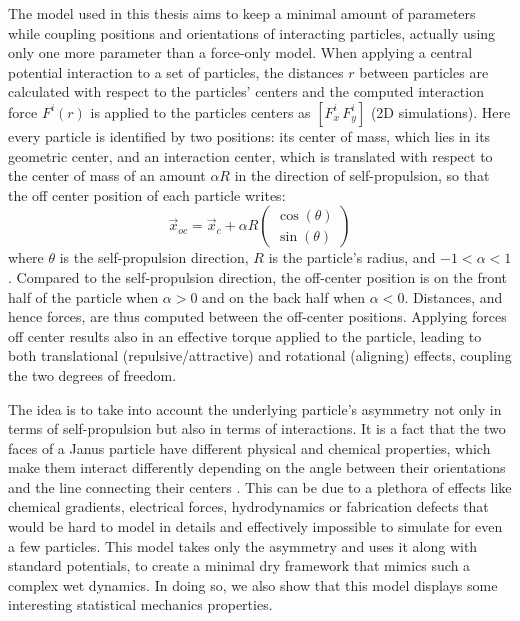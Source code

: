 \documentclass[../../master_thesis_np.tex]{subfiles}
\begin{document}
	The model used in this thesis aims to keep a minimal amount of parameters while coupling positions and orientations of interacting particles, actually using only one more parameter than a force-only model.
	When applying a central potential interaction to a set of particles, the distances $r$ between particles are calculated with respect to the particles' centers and the computed interaction force $F^i(r)$ is applied to the particles centers as $\left[F^i_x\, F^i_y\right]$ (2D simulations).
	Here every particle is identified by two positions: its center of mass, which lies in its geometric center, and an interaction center, which is translated with respect to the center of mass of an amount $\alpha R$ in the direction of self-propulsion, so that the off center position of each particle writes:
	\begin{equation}
		\vec{x}_{oc} = \vec{x}_{c} + \alpha R 
		\begin{pmatrix}
			\cos(\theta)\\
			\sin(\theta)
		\end{pmatrix}
	\end{equation}
	where $\theta$ is the self-propulsion direction, $R$ is the particle's radius, and $-1 < \alpha < 1$. 
	Compared to the self-propulsion direction, the off-center position is on the front half of the particle when $\alpha > 0$ and on the back half when $\alpha < 0$.
	Distances, and hence forces, are thus computed between the off-center positions. 
	Applying forces off center results also in an effective torque applied to the particle, leading to both translational (repulsive/attractive) and rotational (aligning) effects, coupling the two degrees of freedom.
	
	The idea is to take into account the underlying particle's asymmetry not only in terms of self-propulsion but also in terms of interactions. 
	It is a fact that the two faces of a Janus particle have different physical and chemical properties, which make them interact differently depending on the angle between their orientations and the line connecting their centers \cite{singh_pair_2024}. 
	This can be due to a plethora of effects like chemical gradients, electrical forces, hydrodynamics or fabrication defects that would be hard to model in details and effectively impossible to simulate for even a few particles.
	This model takes only the asymmetry and uses it along with standard potentials, to create a minimal dry framework that mimics such a complex wet dynamics.
	In doing so, we also show that this model displays some interesting statistical mechanics properties.
	
\end{document}
